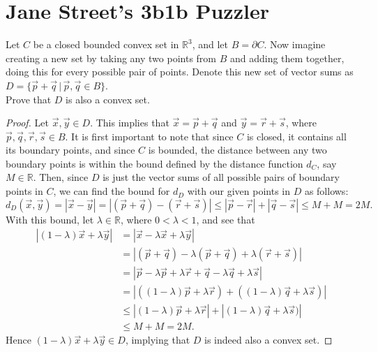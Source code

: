 \documentclass[11pt]{article}
\begin{document}
\pagestyle{fancy}
\fancyhead{}
\tableofcontents
\newpage
\section{Jane Street's 3b1b Puzzler}
Let $C$ be a closed bounded convex set in $\mathbb{R}^3$, and let $B = \partial C$.
Now imagine creating a new set by taking any two points from $B$ and adding them together, doing this for every possible pair of points.
Denote this new set of vector sums as $D = \{\vec{p}+\vec{q} \, | \,\vec{p},\vec{q} \in B\}$.\\
Prove that $D$ is also a convex set.
\begin{proof}
Let $\vec{x},\vec{y} \in D$. This implies that $\vec{x} = \vec{p} + \vec{q}$ and $\vec{y} = \vec{r} + \vec{s}$,
where $\vec{p},\vec{q},\vec{r},\vec{s} \in B$. It is first important to note that since $C$ is closed, it contains all its boundary points,
and since $C$ is bounded, the distance between any two boundary points is within the bound
defined by the distance function $d_C$, say $M \in \mathbb{R}$. Then, since $D$ is just the vector sums of all possible pairs of boundary points in $C$,
we can find the bound for $d_D$ with our given points in $D$ as follows:
\begin{equation*}
d_D(\vec{x},\vec{y}) = |\vec{x} - \vec{y}| = |(\vec{p} + \vec{q}) - (\vec{r} + \vec{s})| \leq |\vec{p} - \vec{r}| + |\vec{q} - \vec{s}| \leq M + M = 2M.
\end{equation*}
With this bound, let $\lambda \in \mathbb{R}$, where $0 < \lambda < 1$, and see that
\begin{align*}
|(1-\lambda)\vec{x} + \lambda\vec{y}| &= |\vec{x} - \lambda\vec{x} + \lambda\vec{y}| \\
                                      &= |(\vec{p}+\vec{q}) - \lambda(\vec{p}+\vec{q}) + \lambda(\vec{r} + \vec{s})| \\
                                      &= |\vec{p} - \lambda\vec{p} + \lambda\vec{r} + \vec{q} - \lambda\vec{q} + \lambda\vec{s}| \\
                                      &= |((1-\lambda)\vec{p} + \lambda\vec{r}) + ((1-\lambda)\vec{q} + \lambda\vec{s})| \\
                                      & \leq |(1-\lambda)\vec{p} + \lambda\vec{r}| + |(1-\lambda)\vec{q} + \lambda\vec{s})| \\
                                      & \leq M + M = 2M.
\end{align*}
Hence $(1-\lambda)\vec{x} + \lambda\vec{y} \in D$, implying that $D$ is indeed also a convex set.
\end{proof}
\end{document}
